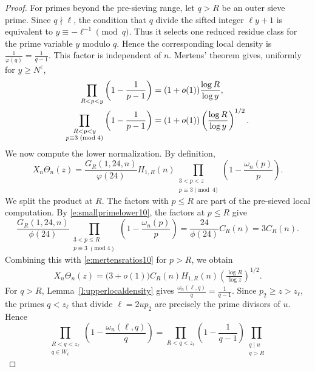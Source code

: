 \documentclass[12pt,reqno]{amsart}
\numberwithin{equation}{section}
\theoremstyle{definition}
\theoremstyle{remark}
\begin{document}
\begin{proof}
For primes beyond the pre-sieving range, let \(q>R\) be an outer sieve
prime.  Since \(q\nmid\ell\), the condition that \(q\) divide the sifted
integer \(\ell y+1\) is equivalent to \(y\equiv-\ell^{-1}\pmod q\).  Thus
it selects one reduced residue class for the prime variable \(y\) modulo
\(q\).  Hence the corresponding local density is $ \frac{1}{\varphi(q)}=\frac{1}{q-1}.
$
This factor is independent of \(n\).  Mertens' theorem gives, uniformly
for \(y\geq N^\varepsilon\),
\begin{align}\label{e:mertensratios10}
 \prod_{R<p<y}\left(1-\frac1{p-1}\right)
 &=(1+o(1))\frac{\log R}{\log y},\notag\\
 \prod_{\substack{R<p<y\\p\equiv3\; (\mathrm{mod}\;4)}}
 \left(1-\frac1{p-1}\right)
 &=(1+o(1))\left(\frac{\log R}{\log y}\right)^{1/2}.
\end{align}
We now compute the lower normalization.  By definition,
\[
 X_n\Theta_n(z)
 =
 \frac{G_R(1,24,n)}{\varphi(24)}H_{1,R}(n)
 \prod_{\substack{3<p<z\\ p\equiv3\pmod4}}
 \left(1-\frac{\omega_n(p)}p\right).
\]
We split the product at \(R\).  The factors with \(p\leq R\) are part of
the pre-sieved local computation. By \eqref{e:smallprimelower10}, the factors at \(p\leq R\) give
\[
 \frac{G_R(1,24,n)}{\phi(24)}
 \prod_{\substack{3<p\leq R\\p\equiv3\;(\mathrm{mod}\;4)}}
 \left(1-\frac{\omega_n(p)}p\right)
 =
 \frac{24}{\phi(24)}C_R(n)
 =
 3C_R(n).
\]  
Combining this with \eqref{e:mertensratios10} for \(p>R\), we obtain
\begin{align}\label{e:lowernormalization10}
 X_n\Theta_n(z)
 =
 \bigl(3+o(1)\bigr)
 C_R(n)H_{1,R}(n)
 \left(\frac{\log R}{\log z}\right)^{1/2}.
\end{align}
For \(q>R\), Lemma~\ref{l:upperlocaldensity} gives $ \frac{\omega_n(\ell,q)}q=\frac1{q-1}.$
Since \(p_2\geq z>z_\ell\), the primes \(q<z_\ell\) that divide
\(\ell=2up_2\) are precisely the prime divisors of \(u\).  Hence
\[
 \prod_{\substack{R<q<z_\ell\\q\in W_\ell}}
 \left(1-\frac{\omega_n(\ell,q)}q\right)
 =
 \prod_{R<q<z_\ell}
 \left(1-\frac1{q-1}\right)
 \prod_{\substack{q\mid u\\q>R}}
\]
\end{proof}
\end{document}
